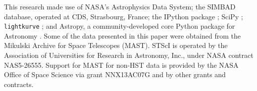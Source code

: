 \documentclass[modern]{aastex62}
\begin{document}
This research made use of NASA's Astrophysics Data System; the SIMBAD database, operated at CDS, Strasbourg, France; the IPython package \citep{PER-GRA:2007}; SciPy \citep{scipy}; \texttt{lightkurve} \citep{lightkurve}; and Astropy, a community-developed core Python package for Astronomy \citep{astropy}. Some of the data presented in this paper were obtained from the Mikulski Archive for Space Telescopes (MAST). STScI is operated by the Association of Universities for Research in Astronomy, Inc., under NASA contract NAS5-26555. Support for MAST for non-HST data is provided by the NASA Office of Space Science via grant NNX13AC07G and by other grants and contracts. 






\newpage









\end{document}
